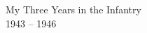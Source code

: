 
\pagestyle{empty}
\vspace*{\fill}
\begin{center}
\HUGE My Three Years in the Infantry\\ \Large 1943 -- 1946
\end{center}
\vspace*{\fill}

\clearpage
\pagestyle{empty}
\mbox{}
\thispagestyle{empty}
